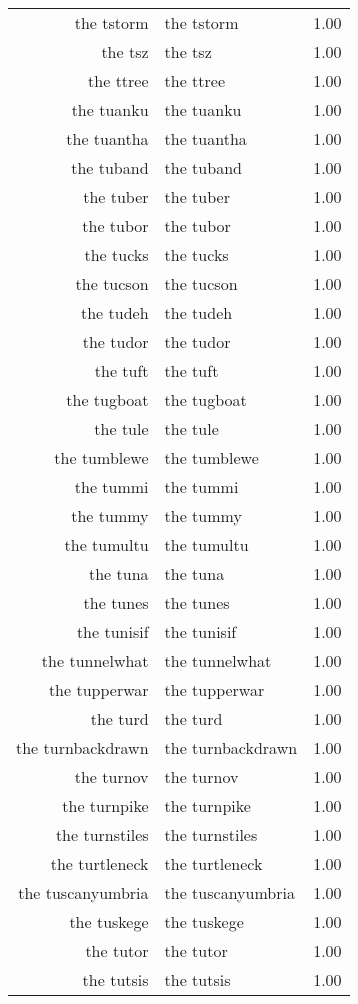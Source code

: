\begin{table}[ht]
\begin{tabular}{rlr}
  the tstorm & the tstorm & 1.00 \\ 
  the tsz & the tsz & 1.00 \\ 
  the ttree & the ttree & 1.00 \\ 
  the tuanku & the tuanku & 1.00 \\ 
  the tuantha & the tuantha & 1.00 \\ 
  the tuband & the tuband & 1.00 \\ 
  the tuber & the tuber & 1.00 \\ 
  the tubor & the tubor & 1.00 \\ 
  the tucks & the tucks & 1.00 \\ 
  the tucson & the tucson & 1.00 \\ 
  the tudeh & the tudeh & 1.00 \\ 
  the tudor & the tudor & 1.00 \\ 
  the tuft & the tuft & 1.00 \\ 
  the tugboat & the tugboat & 1.00 \\ 
  the tule & the tule & 1.00 \\ 
  the tumblewe & the tumblewe & 1.00 \\ 
  the tummi & the tummi & 1.00 \\ 
  the tummy & the tummy & 1.00 \\ 
  the tumultu & the tumultu & 1.00 \\ 
  the tuna & the tuna & 1.00 \\ 
  the tunes & the tunes & 1.00 \\ 
  the tunisif & the tunisif & 1.00 \\ 
  the tunnelwhat & the tunnelwhat & 1.00 \\ 
  the tupperwar & the tupperwar & 1.00 \\ 
  the turd & the turd & 1.00 \\ 
  the turnbackdrawn & the turnbackdrawn & 1.00 \\ 
  the turnov & the turnov & 1.00 \\ 
  the turnpike & the turnpike & 1.00 \\ 
  the turnstiles & the turnstiles & 1.00 \\ 
  the turtleneck & the turtleneck & 1.00 \\ 
  the tuscanyumbria & the tuscanyumbria & 1.00 \\ 
  the tuskege & the tuskege & 1.00 \\ 
  the tutor & the tutor & 1.00 \\ 
  the tutsis & the tutsis & 1.00 \\ 

\end{tabular}
\end{table}
